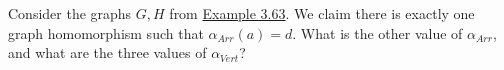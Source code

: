 Consider the graphs $G,H$ from \href{doc/1 math/Seven Sketches in Compositionality/Chapter 3: Databases/3 Functors, natural transformations, and databases/5 The category of instances on a schema/3 Arrow table}{Example 3.63}. We claim there is exactly one graph homomorphism such that $\alpha_{Arr}(a)=d$. What is the other value of $\alpha_{Arr}$, and what are the three values of $\alpha_{Vert}$?